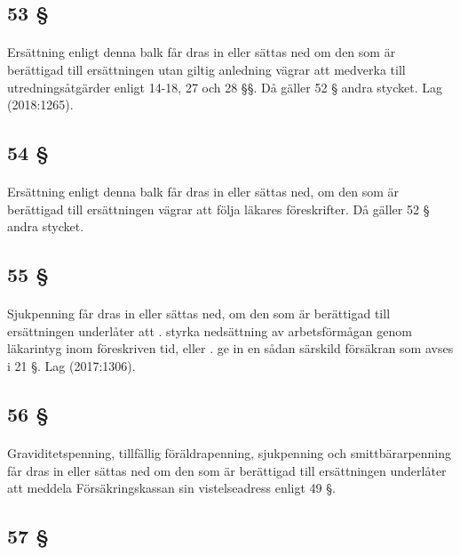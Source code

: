 \documentclass[a4paper,notitlepage,openany,10pt]{book}
\begin{document}
\subsection*{53 §}
\paragraph*{}
Ersättning enligt denna balk får dras in eller sättas ned om den som är berättigad till ersättningen utan giltig anledning vägrar att medverka till utredningsåtgärder enligt 14-18, 27 och 28 §§. Då gäller 52 § andra stycket.
Lag (2018:1265).
\subsection*{54 §}
\paragraph*{}
Ersättning enligt denna balk får dras in eller sättas ned, om den som är berättigad till ersättningen vägrar att följa läkares föreskrifter. Då gäller 52 § andra stycket.
\subsection*{55 §}
\paragraph*{}
Sjukpenning får dras in eller sättas ned, om den som är berättigad till ersättningen underlåter att
. styrka nedsättning av arbetsförmågan genom läkarintyg inom föreskriven tid, eller
. ge in en sådan särskild försäkran som avses i 21 §.
Lag (2017:1306).
\subsection*{56 §}
\paragraph*{}
Graviditetspenning, tillfällig föräldrapenning, sjukpenning och smittbärarpenning får dras in eller sättas ned om den som är berättigad till ersättningen underlåter att meddela Försäkringskassan sin vistelseadress enligt 49 §.
\subsection*{57 §}
\end{document}
